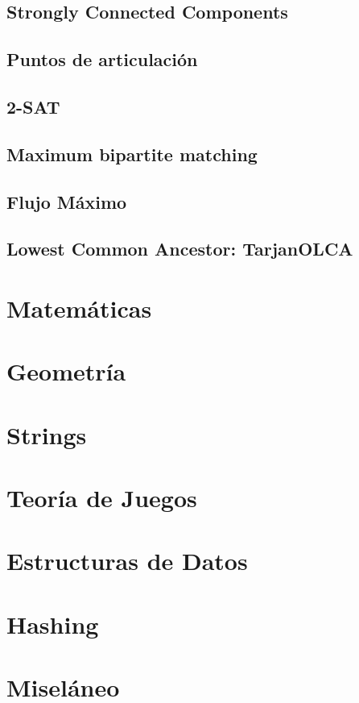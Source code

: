 \documentclass[10pt,letterpaper,twocolumn,twosided]{article}
\begin{document}
\subsection{Strongly Connected Components}

\subsection{Puntos de articulación}

\subsection{2-SAT}

\subsection{Maximum bipartite matching}

\subsection{Flujo Máximo}

\subsection{Lowest Common Ancestor: TarjanOLCA}

\section{Matemáticas}

\section{Geometría}

\section{Strings}

\section{Teoría de Juegos}

\section{Estructuras de Datos}

\section{Hashing} %

\section{Miseláneo}
\end{document}
